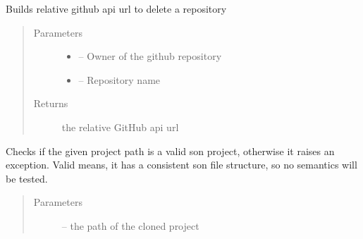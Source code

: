 \documentclass[letterpaper,10pt,english]{sphinxmanual}
\begin{document}
\begin{fulllineitems}
\label{_source/son_editor.impl:son_editor.impl.gitimpl.build_github_delete}
Builds relative github api url to delete a repository
\begin{quote}\begin{description}
\item[{Parameters}] \leavevmode\begin{itemize}
\item {} 
 -- Owner of the github repository

\item {} 
 -- Repository name

\end{itemize}

\item[{Returns}] \leavevmode
the relative GitHub api url

\end{description}\end{quote}

\end{fulllineitems}


\begin{fulllineitems}
\label{_source/son_editor.impl:son_editor.impl.gitimpl.check_son_validity}
Checks if the given project path is a valid son project, otherwise it raises an exception. Valid means, it has
a consistent son file structure, so no semantics will be tested.
\begin{quote}\begin{description}
\item[{Parameters}] \leavevmode
{} -- the path of the cloned project

\end{description}\end{quote}

\end{fulllineitems}

\end{document}

